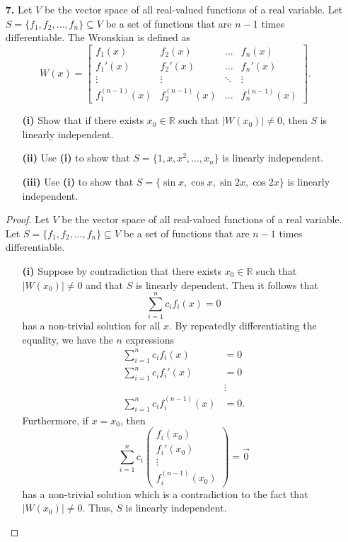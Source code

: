 \documentclass[ 12pt ]{article}
\begin{document}
\begin{enumerate}
	\item[\textbf{7.}] Let $V$ be the vector space of all real-valued functions of a real variable. Let $S = \{ f_1, f_2, \hdots, f_n \} \subseteq V$ be a set of functions that are
		$n-1$ times differentiable. The Wronskian is defined as $$W(x) = \begin{bmatrix} f_1(x) & f_2(x) & \hdots & f_n(x) \\ f_1'(x) & f_2'(x) & \hdots & f_n'(x) \\
		\vdots & \vdots & \ddots & \vdots \\ f_1^{(n-1)}(x) & f_2^{(n-1)}(x) & \hdots & f_n^{(n-1)}(x) \end{bmatrix}.$$
		\begin{enumerate}
			\item[\textbf{(i)}] Show that if there exists $x_0 \in \mathbb{R}$ such that $|W(x_0)| \neq 0$, then $S$ is linearly independent.
			\item[\textbf{(ii)}] Use \textbf{(i)} to show that $S = \{ 1, x, x^2, \hdots, x_n \}$ is linearly independent.
			\item[\textbf{(iii)}] Use \textbf{(i)} to show that $S = \{ \sin x, \cos x, \sin 2x, \cos 2x \}$ is linearly independent.
		\end{enumerate}

		\begin{proof}
			Let $V$ be the vector space of all real-valued functions of a real variable. Let $S = \{ f_1, f_2, \hdots, f_n \} \subseteq V$ be a set of functions that are
			$n-1$ times differentiable.
			\begin{enumerate}
				\item[\textbf{(i)}] Suppose by contradiction that there exists $x_0 \in \mathbb{R}$ such that $|W(x_0)| \neq 0$ and that $S$ is linearly dependent. Then it follows that
					$$\sum_{i=1}^n c_i f_i(x) = 0$$ has a non-trivial solution for all $x$. By repeatedly differentiating the equality, we have the $n$ expressions
					\begin{align*}
						\sum_{i=1}^n c_i f_i(x) &= 0 \\
						\sum_{i=1}^n c_i f_i'(x) &= 0 \\ 
						&\vdots \\
						\sum_{i=1}^n c_i f_i^{(n-1)}(x) &= 0.
					\end{align*}
					Furthermore, if $x = x_0$, then $$\sum_{i=1}^n c_i \begin{pmatrix} f_i(x_0) \\ f_i'(x_0) \\ \vdots \\ f_i^{(n-1)}(x_0) \end{pmatrix} = \vec{0}$$ has a non-trivial
					solution which is a contradiction to the fact that $|W(x_0)| \neq 0$. Thus, $S$ is linearly independent.


\end{enumerate}
\end{proof}
\end{enumerate}
\end{document}
